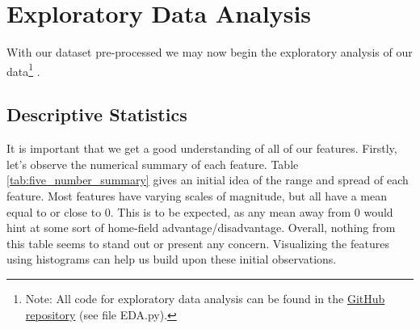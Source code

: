\documentclass[11pt]{amsart}
\theoremstyle{definition}                  %
\theoremstyle{remark}                       %
\numberwithin{equation}{section}
\begin{document}
\section{Exploratory Data Analysis}

With our dataset pre-processed we may now begin the exploratory analysis of our data\footnote{Note: All code for exploratory data analysis can be found in the  \href{https://github.com/HarounShah/Predicting-Results-of-One-Score-Games-in-College-Football}{GitHub repository} (see file EDA.py).} \cite{tukey1977exploratory, james2021introduction}. 

\subsection{Descriptive Statistics}
It is important that we get a good understanding of all of our features. Firstly, let's observe the numerical summary of each feature. Table \ref{tab:five_number_summary} gives an initial idea of the range and spread of each feature. Most features have varying scales of magnitude, but all have a mean equal to or close to 0. This is to be expected, as any mean away from 0 would hint at some sort of home-field advantage/disadvantage. Overall, nothing from this table seems to stand out or present any concern. Visualizing the features using histograms can help us build upon these initial observations.
\end{document}
